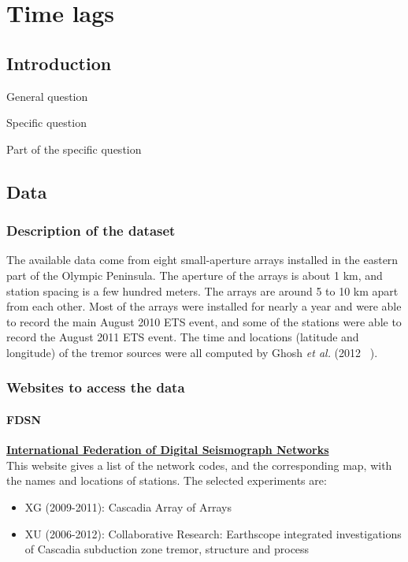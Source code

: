 \documentclass[main.tex]{subfiles}
\begin{document}
\part{Time lags}

\chapter{Introduction}

General question

Specific question

Part of the specific question

\chapter{Data}

\section{Description of the dataset}

The available data come from eight small-aperture arrays installed in the eastern part of the Olympic Peninsula. The aperture of the arrays is about 1 km, and station spacing is a few hundred meters. The arrays are around 5 to 10 km apart from each other. Most of the arrays were installed for nearly a year and were able to record the main August 2010 ETS event, and some of the stations were able to record the August 2011 ETS event. The time and locations (latitude and longitude) of the tremor sources were all computed by Ghosh \textit{et al.} (2012 ~\cite{GHO_2012}).

\section{Websites to access the data}

\subsection{FDSN}

\href{http://www.fdsn.org/networks/}{\textbf{International Federation of Digital Seismograph Networks}} \\

This website gives a list of the network codes, and the corresponding map, with the names and locations of stations. The selected experiments are:
\begin{itemize}
	\item XG (2009-2011): Cascadia Array of Arrays
	\item XU (2006-2012): Collaborative Research: Earthscope integrated investigations of Cascadia subduction zone tremor, structure and process
\end{itemize}
\end{document}
